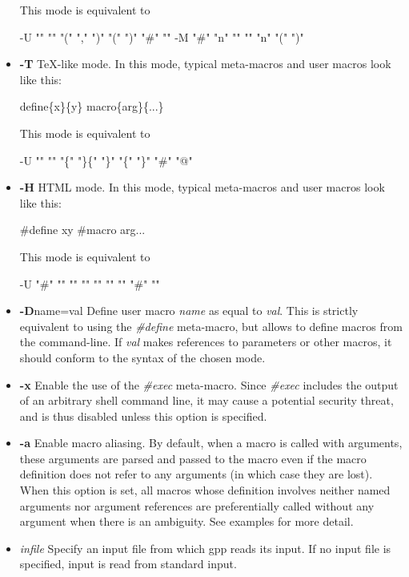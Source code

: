 \begin{itemize}
This mode is equivalent to 

\begin{PRE}
-U "" "" "(" "," ")" "(" ")" "\#" "{\htmlBackslash}{\htmlBackslash}" 
-M "\#" "{\htmlBackslash}n" "" "" "{\htmlBackslash}n" "(" ")"
\end{PRE}

\item {\bf -T}\htmlBR
TeX-like mode.  In this mode, typical meta-macros and user macros look like
this: 

\begin{PRE}
{\htmlBackslash}define\{x\}\{y\}
{\htmlBackslash}macro\{arg\}\{...\}
\end{PRE}

This mode is equivalent to 

\begin{PRE}
-U "{\htmlBackslash}{\htmlBackslash}" "" "\{" "\}\{" "\}" "\{" "\}" "\#" "@"
\end{PRE}

\item {\bf -H}\htmlBR
HTML mode. In this mode, typical meta-macros and user macros look like this: 

\begin{PRE}
{\htmlLt}\#define x{\htmlBar}y{\htmlGt}
{\htmlLt}\#macro arg{\htmlBar}...{\htmlGt}
\end{PRE}

This mode is equivalent to 

\begin{PRE}
-U "{\htmlLt}\#" "{\htmlGt}" "" "{\htmlBar}" "{\htmlGt}" "{\htmlLt}" "{\htmlGt}" "\#" "{\htmlBackslash}{\htmlBackslash}"
\end{PRE}

\item {\bf -D}name=val\htmlBR
Define user macro {\it name} as equal to {\it val}. This is strictly
equivalent to using the {\it \#define} meta-macro, but allows to define macros
from the command-line. If {\it val} makes references to parameters or other
macros, it should conform to the syntax of the chosen mode. 

\item {\bf -x}\htmlBR
Enable the use of the {\it \#exec} meta-macro. Since {\it \#exec} includes the
output of an arbitrary shell command line, it may cause a potential security
threat, and is thus disabled unless this option is specified. 

\item {\bf -a}\htmlBR
Enable macro aliasing. By default, when a macro is called with arguments,
these arguments are parsed and passed to the macro even if the macro
definition does not refer to any arguments (in which case they are lost). When
this option is set, all macros whose definition involves neither named
arguments nor argument references are preferentially called without any
argument when there is an ambiguity. See examples for more detail. 

\item {\it infile}\htmlBR
Specify an input file from which gpp reads its input. If no input file is
specified, input is read from standard input. 
\end{itemize}

